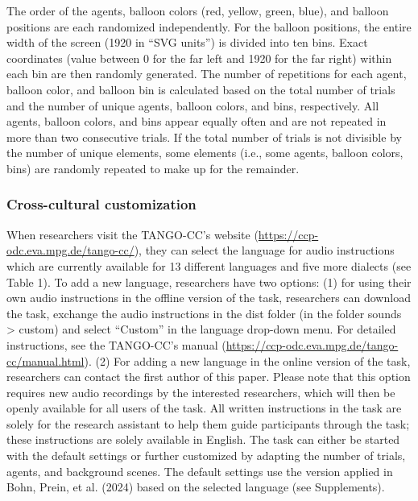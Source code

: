 \documentclass[
  man,floatsintext]{apa7}
\begin{document}
The order of the agents, balloon colors (red, yellow, green, blue), and balloon positions are each randomized independently.
For the balloon positions, the entire width of the screen (1920 in ``SVG units'') is divided into ten bins.
Exact coordinates (value between 0 for the far left and 1920 for the far right) within each bin are then randomly generated.
The number of repetitions for each agent, balloon color, and balloon bin is calculated based on the total number of trials and the number of unique agents, balloon colors, and bins, respectively.
All agents, balloon colors, and bins appear equally often and are not repeated in more than two consecutive trials.
If the total number of trials is not divisible by the number of unique elements, some elements (i.e., some agents, balloon colors, bins) are randomly repeated to make up for the remainder.

\subsubsection{Cross-cultural customization}\label{cross-cultural-customization}

When researchers visit the TANGO-CC's website
(\url{https://ccp-odc.eva.mpg.de/tango-cc/}), they can select the language for audio instructions which are currently available for 13 different languages and five more dialects (see Table 1).
To add a new language, researchers have two options:
(1) for using their own audio instructions in the offline version of the task, researchers can download the task, exchange the audio instructions in the dist folder (in the folder sounds \textgreater{} custom) and select ``Custom'' in the language drop-down menu.
For detailed instructions, see the TANGO-CC's manual (\url{https://ccp-odc.eva.mpg.de/tango-cc/manual.html}).
(2) For adding a new language in the online version of the task, researchers can contact the first author of this paper. Please note that this option requires new audio recordings by the interested researchers, which will then be openly available for all users of the task.
All written instructions in the task are solely for the research assistant to help them guide participants through the task; these instructions are solely available in English.
The task can either be started with the default settings or further customized by adapting the number of trials, agents, and background scenes.
The default settings use the version applied in Bohn, Prein, et al. (2024) based on the selected language (see Supplements).
\end{document}

